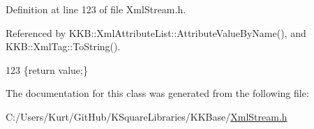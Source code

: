 Definition at line 123 of file Xml\+Stream.\+h.



Referenced by K\+K\+B\+::\+Xml\+Attribute\+List\+::\+Attribute\+Value\+By\+Name(), and K\+K\+B\+::\+Xml\+Tag\+::\+To\+String().


\begin{DoxyCode}
123 \{\textcolor{keywordflow}{return} value;\}
\end{DoxyCode}


The documentation for this class was generated from the following file\+:\begin{DoxyCompactItemize}
\item 
C\+:/\+Users/\+Kurt/\+Git\+Hub/\+K\+Square\+Libraries/\+K\+K\+Base/\hyperlink{_xml_stream_8h}{Xml\+Stream.\+h}\end{DoxyCompactItemize}
